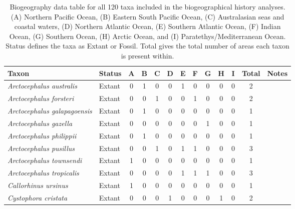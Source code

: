 \begin{longtable}{llccccccccccp{}}

\caption{Biogeography data table for all 120 taxa included in the biogeographical history analyses. (A) Northern Pacific Ocean, (B) Eastern South Pacific Ocean, (C) Australasian seas and coastal waters, (D) Northern Atlantic Ocean, (E) Southern Atlantic Ocean, (F) Indian Ocean, (G) Southern Ocean, (H) Arctic Ocean, and (I) Paratethys/Mediterranean Ocean. Status defines the taxa as Extant or Fossil. Total gives the total number of areas each taxon is present within.}\\

\hline
\textbf{Taxon} & \textbf{Status} & \textbf{A} & \textbf{B} & \textbf{C} & \textbf{D} & \textbf{E} & \textbf{F}
& \textbf{G} & \textbf{H} & \textbf{I} & \textbf{Total} & \textbf{Notes}\\
\hline 
\textit{Arctocephalus australis} &
Extant  &
0 &
1 &
0 &
0 &
1 &
0 &
0 &
0 &
0 &
2  &
\\

\textit{Arctocephalus forsteri} &
Extant  &
0 &
0 &
1 &
0 &
0 &
1 &
0 &
0 &
0 &
2  &
\\

\textit{Arctocephalus galapagoensis} &
Extant &
0 &
1 &
0 &
0 &
0 &
0 &
0 &
0 &
0 &
1 &
\\

\textit{Arctocephalus gazella} &
Extant &
0 &
0 &
0 &
0 &
0 &
0 &
1 &
0 &
0 &
1 &
\\

\textit{Arctocephalus philippii} &
Extant &
0 &
1 &
0 &
0 &
0 &
0 &
0 &
0 &
0 &
1 &
\\

\textit{Arctocephalus pusillus} &
Extant &
0 &
0 &
1 &
0 &
1 &
1 &
0 &
0 &
0 &
3 &
\\

\textit{Arctocephalus townsendi} &
Extant &
1 &
0 &
0 &
0 &
0 &
0 &
0 &
0 &
0 &
1 &
\\

\textit{Arctocephalus tropicalis} &
Extant &
0 &
0 &
0 &
0 &
1 &
1 &
1 &
0 &
0 &
3 &
\\

\textit{Callorhinus ursinus} &
Extant &
1 &
0 &
0 &
0 &
0 &
0 &
0 &
0 &
0 &
1 &
\\

\textit{Cystophora cristata} &
Extant &
0 &
0 &
0 &
1 &
0 &
0 &
0 &
1 &
0 &
2 &
\\


\end{longtable}
